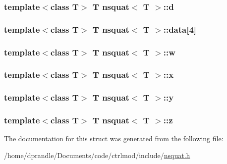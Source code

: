 \hypertarget{structnsquat_a482eada816825eb42f642fb3e9fb2f09}{
\subsubsection[{d}]{\setlength{\rightskip}{0pt plus 5cm}template$<$class T$>$ T {\bf nsquat}$<$ T $>$\-::d}}\label{structnsquat_a482eada816825eb42f642fb3e9fb2f09}
\hypertarget{structnsquat_aede6e2743bebf9facaa1289538980efe}{
\subsubsection[{data}]{\setlength{\rightskip}{0pt plus 5cm}template$<$class T$>$ T {\bf nsquat}$<$ T $>$\-::data\mbox{[}4\mbox{]}}}\label{structnsquat_aede6e2743bebf9facaa1289538980efe}
\hypertarget{structnsquat_ac7e146c7e356e924c2ceed6067c9b7f8}{
\subsubsection[{w}]{\setlength{\rightskip}{0pt plus 5cm}template$<$class T$>$ T {\bf nsquat}$<$ T $>$\-::w}}\label{structnsquat_ac7e146c7e356e924c2ceed6067c9b7f8}
\hypertarget{structnsquat_a22527181ec1041c4866c5ad812a0e59c}{
\subsubsection[{x}]{\setlength{\rightskip}{0pt plus 5cm}template$<$class T$>$ T {\bf nsquat}$<$ T $>$\-::x}}\label{structnsquat_a22527181ec1041c4866c5ad812a0e59c}
\hypertarget{structnsquat_aed9d3b4a36de643a497fd4f89ef84559}{
\subsubsection[{y}]{\setlength{\rightskip}{0pt plus 5cm}template$<$class T$>$ T {\bf nsquat}$<$ T $>$\-::y}}\label{structnsquat_aed9d3b4a36de643a497fd4f89ef84559}
\hypertarget{structnsquat_afc11747164dc0238006ee47af5163ef9}{
\subsubsection[{z}]{\setlength{\rightskip}{0pt plus 5cm}template$<$class T$>$ T {\bf nsquat}$<$ T $>$\-::z}}\label{structnsquat_afc11747164dc0238006ee47af5163ef9}


The documentation for this struct was generated from the following file\-:\begin{DoxyCompactItemize}
\item 
/home/dprandle/\-Documents/code/ctrlmod/include/\hyperlink{nsquat_8h}{nsquat.\-h}\end{DoxyCompactItemize}
